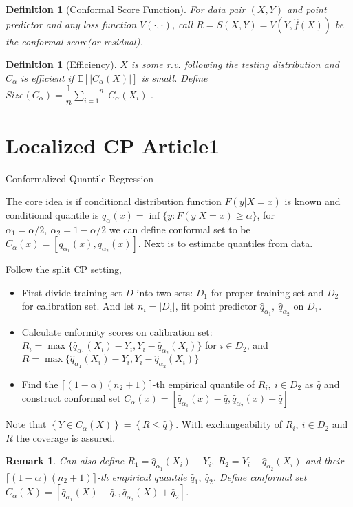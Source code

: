 \documentclass[12pt, a4paper, oneside]{article}
\newtheorem{definition}[theorem]{Definition}
\newtheorem{remark}[theorem]{Remark}
\begin{document}
    \begin{definition}[Conformal Score Function]
        For data pair $(X,Y)$ and point predictor and any loss function $V(\cdot,\cdot)$, call $R=S(X,Y)=V(Y,\hat{f}(X))$ be the conformal score(or residual).
    \end{definition}


    \begin{definition}[Efficiency]
        $X$ is some r.v. following the testing distribution and $C_\alpha$ is efficient if $\mathbb{E}\left[ |C_\alpha(X)| \right]$ is small. Define $Size(C_\alpha)=\dfrac{1}{n}\overset{n}{\underset{i=1}\sum}|C_\alpha(X_i)|$.
    \end{definition}


\section{Localized CP Article1}
    Conformalized Quantile Regression
    \cite{romano2019conformalized}


    The core idea is if conditional distribution function $F(y|X=x)$ is known and conditional quantile is $q_\alpha(x)=\inf\{y:F(y|X=x)\geq\alpha\}$, for $\alpha_1=\alpha/2,\ \alpha_2=1-\alpha/2$ we can define conformal set to be $C_\alpha(x)=\left[ q_{\alpha_1}(x),q_{\alpha_2}(x) \right]$. Next is to estimate quantiles from data.


    Follow the split CP setting, 
    \begin{itemize}
        \item First divide training set $D$ into two sets: $D_1$ for proper training set and $D_2$ for calibration set. And let $n_i=|D_i|$, fit point predictor $\hat{q}_{\alpha_1},\ \hat{q}_{\alpha_2}$ on $D_1$.
        \item Calculate cnformity scores on calibration set: $R_i=\max\{\hat{q}_{\alpha_1}(X_i)-Y_i,Y_i-\hat{q}_{\alpha_2}(X_i)\}$ for $i\in D_2$, and $R=\max\{\hat{q}_{\alpha_1}(X_i)-Y_i,Y_i-\hat{q}_{\alpha_2}(X_i)\}$
        \item Find the $\lceil(1-\alpha)(n_2+1)\rceil$-th empirical quantile of $R_i,\ i\in D_2$ as $\hat{q}$ and construct conformal set $C_\alpha(x)=\left[ \hat{q}_{\alpha_1}(x)-\hat{q},\hat{q}_{\alpha_2}(x)+\hat{q} \right]$
    \end{itemize}
    Note that $\left\{ Y\in C_\alpha(X) \right\}=\left\{ R\leq\hat{q} \right\}$. With exchangeability of $R_i,\ i\in D_2$ and $R$ the coverage is assured.


    \begin{remark}
        Can also define $R_1=\hat{q}_{\alpha_1}(X_i)-Y_i,\ R_2=Y_i-\hat{q}_{\alpha_2}(X_i)$ and their $\lceil(1-\alpha)(n_2+1)\rceil$-th empirical quantile $\hat{q}_1,\ \hat{q}_2$. Define conformal set $C_\alpha(X)=\left[ \hat{q}_{\alpha_1}(X)-\hat{q}_1,\hat{q}_{\alpha_2}(X)+\hat{q}_2 \right]$.
    \end{remark}
\end{document}
